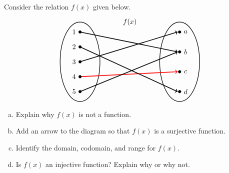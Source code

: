 \documentclass[11pt,letterpaper]{article}
\begin{document}

 Consider the relation $f(x)$ given below. 
	\[
	\begin{tikzpicture}
	\node at (2.5,2) {$f(x)$};
	\draw[line width=0.03cm] (0,0) circle (1 and 2);
	\draw[line width=0.03cm] (5,0) circle (1 and 2);
	
	\draw[line width= 0.04cm,->,red] (0,-0.75) -- (4.9,-0.5);
	
	\draw[fill=black] (0,1.5) circle (0.07);
	\draw[fill=black] (0,0.75) circle (0.07);
	\draw[fill=black] (0,0) circle (0.07);
	\draw[fill=black] (0,-0.75) circle (0.07);
	\draw[fill=black] (0,-1.5) circle (0.07);
	
	\draw[fill=black] (5,1.5) circle (0.07);
	\draw[fill=black] (5,0.50) circle (0.07);
	\draw[fill=black] (5,-0.5) circle (0.07);
	\draw[fill=black] (5,-1.5) circle (0.07);
	
	
	\draw[line width=0.04cm,->] (0,1.5) -- (4.9,0.50);
	\draw[line width=0.04cm,->] (0,0.75) -- (4.9,-1.5);
	\draw[line width=0.04cm,->] (0,0) -- (4.9,1.5);
	\draw[line width=0.04cm,->] (0,-1.5) -- (4.9,0.5);
	
	
	\node at (-0.3,1.5) {$1$};
	\node at (-0.3,0.75) {$2$};
	\node at (-0.3,0) {$3$};
	\node at (-0.3,-0.75) {$4$};
	\node at (-0.3,-1.5) {$5$};
	
	\node at (5.3,1.5) {$a$};
	\node at (5.3,0.5) {$b$};
	\node at (5.3,-0.5) {$c$};
	\node at (5.3,-1.5) {$d$};
	\end{tikzpicture}
	\]

\begin{enumerate}[(a)]
\item Explain why $f(x)$ is not a function. 
\item Add an arrow to the diagram so that $f(x)$ is a surjective function.
\item Identify the domain, codomain, and range for $f(x)$. 
\item Is $f(x)$ an injective function? Explain why or why not. 
\end{enumerate} \pspace
\end{document}
